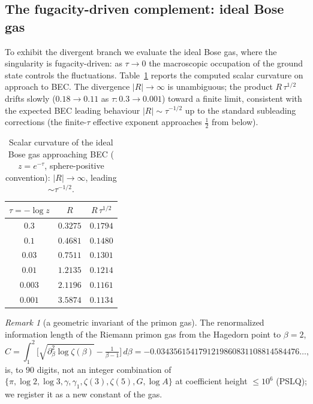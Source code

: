 \documentclass[a4paper,11pt]{article}
\theoremstyle{plain}
\theoremstyle{definition}
\theoremstyle{remark}
\newtheorem{remark}{Remark}
\newcommand{\Ric}{R}
\begin{document}
\subsection{The fugacity-driven complement: ideal Bose gas}\label{sec:bose}
To exhibit the divergent branch we evaluate the ideal Bose gas, where the singularity is
fugacity-driven: as $\tau\to0$ the macroscopic occupation of the ground state controls the
fluctuations. Table~\ref{tab:bose_divergence} reports the computed scalar curvature on approach to
BEC. The divergence $|\Ric|\to\infty$ is unambiguous; the product $\Ric\,\tau^{1/2}$ drifts slowly
($0.18\to0.11$ as $\tau:0.3\to0.001$) toward a finite limit, consistent with the expected BEC leading
behaviour $|\Ric|\sim\tau^{-1/2}$ up to the standard subleading corrections (the finite-$\tau$ effective
exponent approaches $\tfrac12$ from below).

\begin{table}[h]
\centering
\renewcommand{\arraystretch}{1.15}
\begin{tabular}{c|cc}
$\tau=-\log z$ & $\Ric$ & $\Ric\,\tau^{1/2}$\\
\hline
$0.3$   & $0.3275$ & $0.1794$\\
$0.1$   & $0.4681$ & $0.1480$\\
$0.03$  & $0.7511$ & $0.1301$\\
$0.01$  & $1.2135$ & $0.1214$\\
$0.003$ & $2.1196$ & $0.1161$\\
$0.001$ & $3.5874$ & $0.1134$\\
\end{tabular}
\caption{Scalar curvature of the ideal Bose gas approaching BEC ($z=e^{-\tau}$, sphere-positive
convention): $|\Ric|\to\infty$, leading $\sim\tau^{-1/2}$.}
\label{tab:bose_divergence}
\end{table}

\begin{remark}[a geometric invariant of the primon gas]\label{rem:Cconst}
The renormalized information length of the Riemann primon gas from the Hagedorn point to $\beta=2$,
\[
   C=\int_{1}^{2}\!\Big[\sqrt{\partial_\beta^2\log\zeta(\beta)}-\tfrac{1}{\beta-1}\Big]\,d\beta
    =-0.0343561541791219860831108814584476\ldots,
\]
is, to $90$ digits, not an integer combination of $\{\pi,\log2,\log3,\gamma,\gamma_1,\zeta(3),\zeta(5),
G,\log A\}$ at coefficient height $\le10^{6}$ (PSLQ); we register it as a new constant of the gas.
\end{remark}

\end{document}
